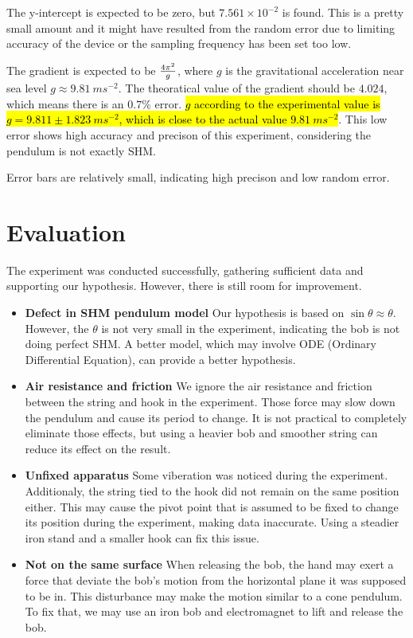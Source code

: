 \documentclass[a4paper]{article}
\begin{document}
The y-intercept is expected to be zero, but $7.561\times 10^{-2}$ is found. This is a pretty small amount and it might have resulted from the random error due to limiting accuracy of the device or the sampling frequency has been set too low.

The gradient is expected to be $4\pi^2 \over g$, where $g$ is the gravitational acceleration near sea level $g\approx \SI{9.81}{ms^{-2}}$. The theoratical value of the gradient should be $4.024$, which means there is an $0.7\%$ error. \hl{$g$ according to the experimental value is $g=9.811\pm 1.823\SI{}{ms^{-2}}$, which is close to the actual value $\SI{9.81}{ms^{-2}}$}. This low error shows high accuracy and precison of this experiment, considering the pendulum is not exactly SHM.

Error bars are relatively small, indicating high precison and low random error. 


\section{Evaluation}

The experiment was conducted successfully, gathering sufficient data and supporting our hypothesis. However, there is still room for improvement. 

\begin{itemize}
    \item \textbf{Defect in SHM pendulum model} Our hypothesis is based on $\sin\theta\approx\theta$. However, the $\theta$ is not very small in the experiment, indicating the bob is not doing perfect SHM. A better model, which may involve ODE (Ordinary Differential Equation), can provide a better hypothesis.
    \item \textbf{Air resistance and friction} We ignore the air resistance and friction between the string and hook in the experiment. Those force may slow down the pendulum and cause its period to change. It is not practical to completely eliminate those effects, but using a heavier bob and smoother string can reduce its effect on the result. 
    \item \textbf{Unfixed apparatus} Some viberation was noticed during the experiment. Additionaly, the string tied to the hook did not remain on the same position either. This may cause the pivot point that is assumed to be fixed to change its position during the experiment, making data inaccurate. Using a steadier iron stand and a smaller hook can fix this issue. 
    \item \textbf{Not on the same surface} When releasing the bob, the hand may exert a force that deviate the bob's motion from the horizontal plane it was supposed to be in. This disturbance may make the motion similar to a cone pendulum. To fix that, we may use an iron bob and electromagnet to lift and release the bob.
\end{itemize}
\end{document}

